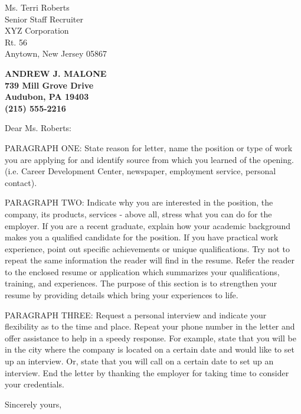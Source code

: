 \documentclass[11pt]{letter} %
\begin{document}
\signature{Andrew Malone}                  %
\longindentation=0pt                       %
\let\raggedleft\raggedright                %

\begin{letter}{Ms. Terri Roberts \\
Senior Staff Recruiter \\
XYZ Corporation \\
Rt. 56 \\
Anytown, New Jersey 05867}

\begin{center}
\large\bf ANDREW J. MALONE \\
739 Mill Grove Drive \\ Audubon, PA 19403 \\ (215) 555-2216
\end{center}
\vfill %



\opening{Dear Ms. Roberts:}

\noindent PARAGRAPH ONE: State reason for letter, name the position or type
of work you are applying for and identify source from  which  you
learned   of   the  opening.  (i.e.  Career  Development  Center,
newspaper, employment service, personal contact).

\noindent PARAGRAPH  TWO:  Indicate why you are interested in the position,
the company, its products, services - above all, stress what you
can  do  for  the employer. If you are a recent graduate, explain  how
your academic background makes you a qualified candidate for the
position. If  you have practical work experience, point out
specific achievements or unique qualifications. Try not to repeat
the  same  information  the reader will find in the resume. Refer
the reader to the enclosed resume or application which summarizes
your  qualifications,  training,  and experiences. The purpose of
this section is to strengthen your resume  by  providing  details
which bring your experiences to life.

\noindent PARAGRAPH THREE: Request a personal interview and  indicate  your
flexibility as to the time and place. Repeat your phone number in
the letter and offer assistance to help in a speedy response. For
example,  state that you will be in the city where the company is
located on a certain date and would like to set up an  interview.
Or,  state  that  you  will  call  on a certain date to set up an
interview. End the letter by thanking  the  employer  for  taking
time to consider your credentials.

\closing{Sincerely yours,}


\encl{}  				%

\end{letter}
\end{document}
